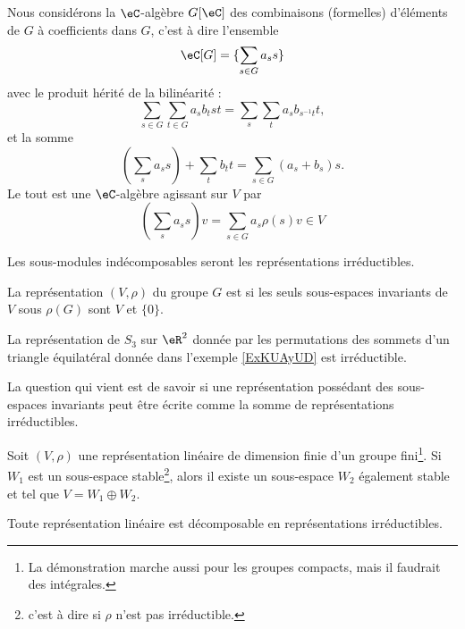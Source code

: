 Nous considérons la \( \eC\)-algèbre \( G[\eC]\) des combinaisons (formelles) d'éléments de \( G\) à coefficients dans \( G\), c'est à dire l'ensemble
\begin{equation}
    \eC[G]=\{ \sum_{s\in G}a_ss \}
\end{equation}
avec le produit hérité de la bilinéarité :
\begin{equation}
    \sum_{s\in G}\sum_{t\in G}a_sb_tst=\sum_s\sum_t a_sb_{s^{-1}t}t,
\end{equation}
et la somme
\begin{equation}
    (\sum_sa_ss)+\sum_tb_tt=\sum_{s\in G}(a_s+b_s)s.
\end{equation}
Le tout est une \( \eC\)-algèbre agissant sur \( V\) par
\begin{equation}
    \left( \sum_sa_ss \right)v=\sum_{s\in G}a_s\rho(s)v\in V
\end{equation}

Les sous-modules indécomposables seront les représentations irréductibles.

\begin{definition}
    La représentation \( (V,\rho)\) du groupe \( G\) est  si les seuls sous-espaces invariants de \( V\) sous \( \rho(G)\) sont $V$ et \( \{ 0 \}\).
\end{definition}

\begin{example}
    La représentation de \( S_3\) sur \( \eR^2\) donnée par les permutations des sommets d'un triangle équilatéral donnée dans l'exemple \ref{ExKUAyUD} est irréductible.
\end{example}

La question qui vient est de savoir si une représentation possédant des sous-espaces invariants peut être écrite comme la somme de représentations irréductibles.

\begin{proposition} \label{PropHeyoAN}  
    Soit \( (V,\rho)\) une représentation linéaire de dimension finie d'un groupe fini\footnote{La démonstration marche aussi pour les groupes compacts, mais il faudrait des intégrales.}. Si \( W_1\) est un sous-espace stable\footnote{c'est à dire si \( \rho\) n'est pas irréductible.}, alors il existe un sous-espace \( W_2\) également stable et tel que \( V=W_1\oplus W_2\).

    Toute représentation linéaire est décomposable en représentations irréductibles.
\end{proposition}

